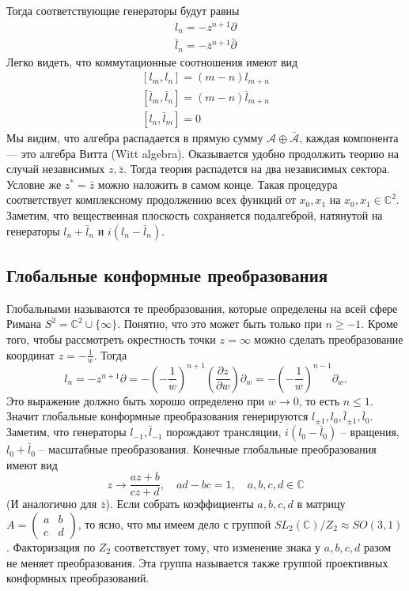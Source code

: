\documentclass[a4paper,12pt]{article}
\theoremstyle{definition}
\theoremstyle{definition}
\theoremstyle{definition}
\begin{document}
Тогда соответствующие генераторы будут равны
\begin{eqnarray}
  \label{eq:229}
  l_{n}=-z^{n+1}\partial\\
  \bar l_{n}=-\bar z^{n+1}\bar \partial 
\end{eqnarray}
Легко видеть, что коммутационные соотношения имеют вид
\begin{eqnarray}
  \label{eq:230}
  \left[l_{m},l_{n}\right]=(m-n) l_{m+n}\\
  \left[\bar l_{m},\bar l_{n}\right]=(m-n) \bar l_{m+n}\\  
  \left[l_{n},\bar l_{m}\right]=0
\end{eqnarray}
Мы видим, что алгебра распадается в прямую сумму $\mathcal{A} \oplus \bar{\mathcal{A}}$, каждая
компонента --- это алгебра Витта (Witt algebra). Оказывается удобно продолжить теорию на случай
независимых $z,\bar z$. Тогда теория распадется на два независимых сектора. Условие же $z^{*}=\bar
z$ можно наложить в самом конце. 
Такая процедура соответствует комплексному продолжению всех функций
от $x_{0},x_{1}$ на $x_{0},x_{1}\in \mathbb{C}^{2}$. Заметим, что вещественная плоскость сохраняется
подалгеброй, натянутой на генераторы $l_{n}+\bar l_{n}$ и $i(l_{n}-\bar l_{n})$. 

\subsection{Глобальные конформные преобразования}
\label{sec:global-conformal}

Глобальными называются те преобразования, которые определены на всей сфере Римана
$S^{2}=\mathbb{C}^{2}\cup \{\infty\}$. Понятно, что это может быть только при $n\geq -1$. Кроме
того, чтобы рассмотреть окрестность точки $z=\infty$ можно сделать преобразование координат
$z=-\frac{1}{w}$. Тогда 
\begin{equation}
  \label{eq:231}
  l_{n}=-z^{n+1}\partial = - \left(-\frac{1}{w}\right)^{n+1}\left(\frac{\partial z}{\partial w}\right) \partial_{w}=-\left(-\frac{1}{w}\right)^{n-1}\partial_{w}.
\end{equation}
Это выражение должно быть хорошо определено при $w\to 0$, то есть $n\leq 1$. Значит глобальные
конформные преобразования генерируются $l_{\pm 1},l_{0},\bar l_{\pm 1},\bar l_{0}$. Заметим, что
генераторы $l_{-1},\bar l_{-1}$ порождают трансляции, $i(l_{0}-\bar l_{0})$ -- вращения, $l_{0}+\bar
l_{0}$ -- масштабные преобразования. 
Конечные глобальные преобразования имеют вид 
\begin{equation}
  \label{eq:232}
  z\to \frac{az+b}{cz+d}, \quad ad-bc=1,\quad a,b,c,d\in \mathbb{C}
\end{equation}
(И аналогично для $\bar z$).
Если собрать коэффициенты $a,b,c,d$ в матрицу $A=
\begin{pmatrix}
  a & b\\
  c & d
\end{pmatrix}$, 
то ясно, что мы имеем дело с группой $SL_{2}(\mathbb{C})/Z_{2}\approx SO(3,1)$. Факторизация по
$Z_{2}$ соответствует тому, что изменение знака у $a,b,c,d$ разом не меняет преобразования. Эта
группа называется также группой проективных конформных преобразований.  
\end{document}
